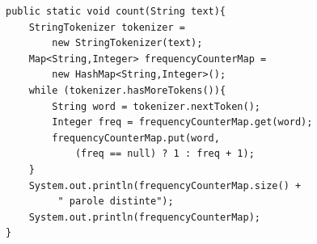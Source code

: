 \documentclass{article}
\begin{document}
\begin{lstlisting}
public static void count(String text){
    StringTokenizer tokenizer = 
        new StringTokenizer(text);
    Map<String,Integer> frequencyCounterMap = 
        new HashMap<String,Integer>();
    while (tokenizer.hasMoreTokens()){
        String word = tokenizer.nextToken();
        Integer freq = frequencyCounterMap.get(word);
        frequencyCounterMap.put(word,
            (freq == null) ? 1 : freq + 1);
    }
    System.out.println(frequencyCounterMap.size() +
         " parole distinte");
    System.out.println(frequencyCounterMap);
}
\end{lstlisting}



%
%
%
%
%
\end{document}

